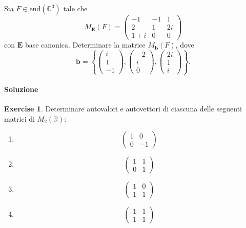 \documentclass{article}
\theoremstyle{plain}
\theoremstyle{definition}
\newtheorem{xca}[exmp]{Exercise}
\theoremstyle{remark}
\begin{document}
\begin{bxthm}
    Sia $F\in\mathrm{end}(\mathbb{C}^3)$ tale che 
    \[M_\mathbf{E}(F)=
    \begin{pmatrix}
        -1&-1&1\\
        2&1&2i\\
        1+i&0&0
    \end{pmatrix}\]
    con $\mathbf{E}$ base canonica. Determinare la matrice $M_\mathbf{b}(F)$, dove
    \[\mathbf{b}=\left\{\begin{pmatrix}i\\1\\-1\end{pmatrix},\begin{pmatrix}-2\\i\\0\end{pmatrix},\begin{pmatrix}2i\\1\\i\end{pmatrix}\right\}.\]
\end{bxthm}
\paragraph{Soluzione}

\vspace{10pt}

\begin{bxthm}
\begin{xca}
    Determinare autovalori e autovettori di ciascuna delle seguenti matrici di $M_2(\mathbb{R})$:
    \begin{enumerate}
        \item \[\begin{pmatrix}1&0\\0&-1\end{pmatrix}\]
        \item \[\begin{pmatrix}1&1\\0&1\end{pmatrix}\]
        \item \[\begin{pmatrix}1&0\\1&1\end{pmatrix}\]
        \item \[\begin{pmatrix}1&1\\1&1\end{pmatrix}\]
    \end{enumerate}
\end{xca}
\end{bxthm}
\end{document}
